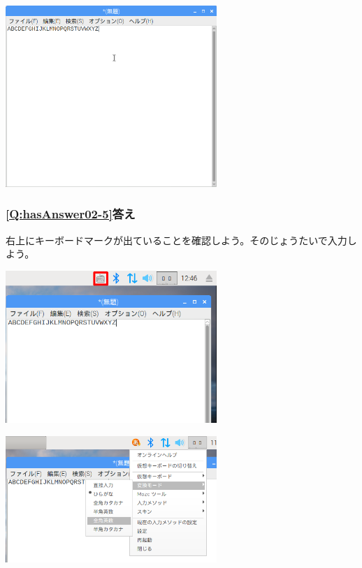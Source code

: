 \documentclass[a4paper,12pt]{jarticle}
\begin{document}
\centering
\includegraphics[width=0.6\textwidth]{textbook-img217.png}
\flushleft

\clearpage\subsubsection{\bfseries
\ref*{Q:hasAnswer02-5}答え}

右上にキーボードマークが出ていることを確認しよう。そのじょうたいで入力しよう。


\bigskip


\centering
\includegraphics[width=0.6\textwidth]{textbook-img218.png}
\flushleft


\bigskip





\centering
\includegraphics[width=0.6\textwidth]{textbook-img219.png}
\flushleft
\end{document}
